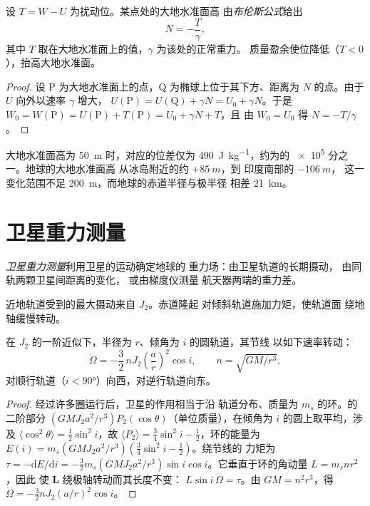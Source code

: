 \begin{proposition}[布伦斯公式]\label{prop:b3:gravity-geodesy:bruns}
设 $T = W - U$ 为扰动位。某点处的大地水准面高
由\emph{布伦斯公式}给出
\[
  N = -\frac{T}{\gamma},
\]
其中 $T$ 取在大地水准面上的值，$\gamma$ 为该处的正常重力。
质量盈余使位降低（$T < 0$），抬高大地水准面。
\end{proposition}

\begin{proof}
设 P 为大地水准面上的点，Q 为椭球上位于其下方、距离为
$N$ 的点。由于 $U$ 向外以速率 $\gamma$ 增大，
$U(\mathrm P) = U(\mathrm Q) + \gamma N = U_0 + \gamma N$。于是
$W_0 = W(\mathrm P) = U(\mathrm P) + T(\mathrm P) = U_0 + \gamma N + T$，且
由 $W_0 = U_0$ 得 $N = -T/\gamma$。
\end{proof}

大地水准面高为 \qty{50}{m} 时，对应的位差仅为
\qty{490}{J.kg^{-1}}，约为的 \num{e5} 分之一。地球的大地水准面高
从冰岛附近的约 $+\qty{85}{m}$，到
印度南部的 $-\qty{106}{m}$，
这一变化范围不足 \qty{200}{m}，而地球的赤道半径与极半径
相差 \qty{21}{km}。

\section{卫星重力测量}

\begin{definition}[卫星重力测量]\label{def:b3:gravity-geodesy:satgrav}
\emph{卫星重力测量}利用卫星的运动确定地球的
重力场：由卫星轨道的长期摄动，
由同轨两颗卫星间距离的变化，
或由梯度仪测量
航天器两端的重力差。
\end{definition}

近地轨道受到的最大摄动来自 $J_2$。赤道隆起
对倾斜轨道施加力矩，使轨道面
绕地轴缓慢转动。

\begin{proposition}[节点进动]\label{prop:b3:gravity-geodesy:nodal}
在 $J_2$ 的一阶近似下，半径为 $r$、倾角为 $i$ 的圆轨道，其节线
以如下速率转动：
\[
  \dot\Omega = -\frac32\,nJ_2\left(\frac ar\right)^2\cos i,\qquad n = \sqrt{GM/r^3} ,
\]
对顺行轨道（$i < \ang{90}$）向西，对逆行轨道向东。
\end{proposition}

\begin{proof}
经过许多圈运行后，卫星的作用相当于沿
轨道分布、质量为 $m_s$ 的环。的二阶部分
$(GMJ_2a^2/r^3)P_2(\cos\theta)$（单位质量），在倾角为
$i$ 的圆上取平均，涉及 $\langle\cos^2\theta\rangle = \tfrac12\sin^2i$，故
$\langle P_2\rangle = \tfrac34\sin^2i - \tfrac12$，环的能量为
$E(i) = m_s(GMJ_2a^2/r^3)(\tfrac34\sin^2i - \tfrac12)$。绕节线的
力矩为 $\tau = -\mathrm dE/\mathrm di = -\tfrac32m_s(GMJ_2a^2/r^3)\sin
i\cos i$。它垂直于环的角动量 $L = m_snr^2$，因此
使 $\mathbf L$ 绕极轴转动而其长度不变：
$L\sin i\,\dot\Omega = \tau$。由 $GM = n^2r^3$，得 $\dot\Omega =
-\tfrac32nJ_2(a/r)^2\cos i$。
\end{proof}

